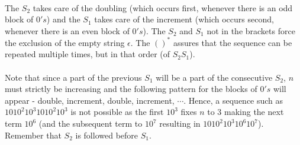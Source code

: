 \documentclass[11pt,letterpaper]{article}
\begin{document}
\paragraph{}
The $S_2$ takes care of the doubling (which occurs first, whenever there is an odd block of $0's$) and the $S_1$ takes care of the increment (which occurs second, whenever there is an even block of $0's$). The $S_2$ and $S_1$ not in the brackets force the exclusion of the empty string $\epsilon$. The $()^*$ assures that the sequence can be repeated multiple times, but in that order (of $S_2S_1$).
\paragraph{}
\small Note that since a part of the previous $S_1$ will be a part of the consecutive $S_2$, $n$ must strictly be increasing and the following pattern for the blocks of $0's$ will appear - double, increment, double, increment, $\cdots$.
Hence, a sequence such as $1010^{2}10^{3}1010^{2}10^{3}$ is not possible as the first $10^{3}$ fixes $n$ to $3$ making the next term $10^{6}$ (and the subsequent term to $10^{7}$ resulting in $1010^{2}10^{3}10^{6}10^{7}$). Remember that $S_2$ is followed before $S_1$.
\end{document}
